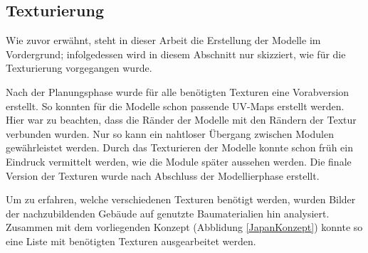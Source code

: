 \subsection{Texturierung}
Wie zuvor erwähnt, steht in dieser Arbeit die Erstellung der Modelle im Vordergrund; infolgedessen wird in diesem Abschnitt nur skizziert, wie für die Texturierung vorgegangen wurde.
\par
Nach der Planungsphase wurde für alle benötigten Texturen eine Vorabversion erstellt. So konnten für die Modelle schon passende UV-Maps erstellt werden. Hier war zu beachten, dass die Ränder der Modelle mit den Rändern der Textur verbunden wurden. Nur so kann ein nahtloser Übergang zwischen Modulen gewährleistet werden. Durch das Texturieren der Modelle konnte schon früh ein Eindruck vermittelt werden, wie die Module später aussehen werden. Die finale Version der Texturen wurde nach Abschluss der Modellierphase erstellt.
\par
Um zu erfahren, welche verschiedenen Texturen benötigt werden, wurden Bilder der nachzubildenden Gebäude auf genutzte Baumaterialien hin analysiert. Zusammen mit dem vorliegenden Konzept (Abblidung \ref{JapanKonzept}) konnte so eine Liste mit benötigten Texturen ausgearbeitet werden.
